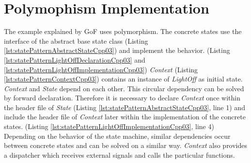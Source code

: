 {\section{Polymophism Implementation}\label{sec:polymophismImplementation}
\noindent The example explained by GoF uses polymorphism. The concrete states use the interface of the abstract base state class (Listing \ref{lst:statePatternAbstractStateCpp03}) and implement the behavior. (Listing \ref{lst:statePatternLightOffDeclarationCpp03} and \ref{lst:statePatternLightOffImplementationCpp03}) \emph{Context} (Listing \ref{lst:statePatternContextCpp03}) contains an instance of \emph{LightOff} as initial state. \emph{Context} and \emph{State} depend on each other. This circular dependency can be solved by forward declaration. Therefore it is necessary to declare \emph{Context} once within the header file of \emph{State} (Listing \ref{lst:statePatternAbstractStateCpp03}, line 1) and include the header file of \emph{Context} later within the implementation of the concrete states. (Listing \ref{lst:statePatternLightOffImplementationCpp03}, line 4) Depending on the behavior of the state machine, similar dependencies occur between concrete states and can be solved on a similar way. \emph{Context} also provides a dispatcher which receives external signals and calls the particular functions. 



\FloatBarrier


\FloatBarrier


\FloatBarrier
\newpage


}

